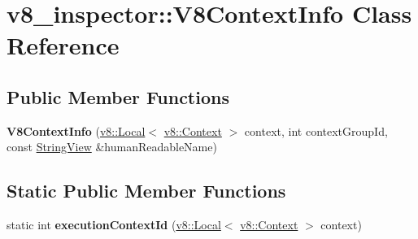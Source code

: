 \hypertarget{classv8__inspector_1_1V8ContextInfo}{}\section{v8\+\_\+inspector\+:\+:V8\+Context\+Info Class Reference}
\label{classv8__inspector_1_1V8ContextInfo}
\subsection*{Public Member Functions}
\begin{DoxyCompactItemize}
\item 
\mbox{\label{classv8__inspector_1_1V8ContextInfo_a820147b336211cd5fef928151bd143c4}} 
{\bfseries V8\+Context\+Info} (\mbox{\hyperlink{classv8_1_1Local}{v8\+::\+Local}}$<$ \mbox{\hyperlink{classv8_1_1Context}{v8\+::\+Context}} $>$ context, int context\+Group\+Id, const \mbox{\hyperlink{classv8__inspector_1_1StringView}{String\+View}} \&human\+Readable\+Name)
\end{DoxyCompactItemize}
\subsection*{Static Public Member Functions}
\begin{DoxyCompactItemize}
\item 
\mbox{\label{classv8__inspector_1_1V8ContextInfo_a8fad8315e1b66cc92ddd733595fe9087}} 
static int {\bfseries execution\+Context\+Id} (\mbox{\hyperlink{classv8_1_1Local}{v8\+::\+Local}}$<$ \mbox{\hyperlink{classv8_1_1Context}{v8\+::\+Context}} $>$ context)
\end{DoxyCompactItemize}
